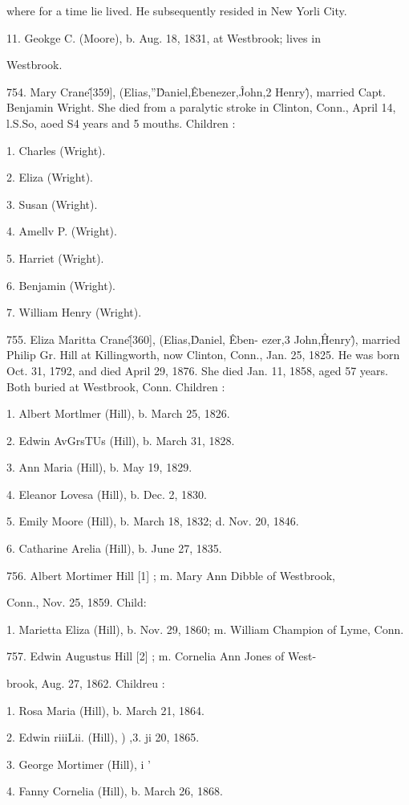 where for a time lie lived. He subsequently resided in New 
Yorli City. 

11. Geokge C. (Moore), b. Aug. 18, 1831, at Westbrook; lives in 

Westbrook. 

754. Mary Crane\^ [359], (Elias,''\^ Daniel,\^ Ebenezer,\^ John,2 
Henry\^), married Capt. Benjamin Wright. She died from a 
paralytic stroke in Clinton, Conn., April 14, l.S.So, aoed S4 years 
and 5 mouths. Children : 

1. Charles (Wright). 

2. Eliza (Wright). 

3. Susan (Wright). 

4. Amellv P. (Wright). 

5. Harriet (Wright). 

6. Benjamin (Wright). 

7. William Henry (Wright). 

755. Eliza Maritta Crane\^ [360], (Elias,\^ Daniel, \^ Eben- 
ezer,3 John,\^ Henry\^), married Philip Gr. Hill at Killingworth, 
now Clinton, Conn., Jan. 25, 1825. He was born Oct. 31, 1792, 
and died April 29, 1876. She died Jan. 11, 1858, aged 57 years. 
Both buried at Westbrook, Conn. Children : 

1. Albert Mortlmer (Hill), b. March 25, 1826. 

2. Edwin AvGrsTUs (Hill), b. March 31, 1828. 

3. Ann Maria (Hill), b. May 19, 1829. 

4. Eleanor Lovesa (Hill), b. Dec. 2, 1830. 

5. Emily Moore (Hill), b. March 18, 1832; d. Nov. 20, 1846. 

6. Catharine Arelia (Hill), b. June 27, 1835. 

756. Albert Mortimer Hill [1] ; m. Mary Ann Dibble of Westbrook, 

Conn., Nov. 25, 1859. Child: 

1. Marietta Eliza (Hill), b. Nov. 29, 1860; m. William 
Champion of Lyme, Conn. 

757. Edwin Augustus Hill [2] ; m. Cornelia Ann Jones of West- 

brook, Aug. 27, 1862. Childreu : 

1. Rosa Maria (Hill), b. March 21, 1864. 

2. Edwin riiiLii. (Hill), ) ,3. ji 20, 1865. 

3. George Mortimer (Hill), i ' 

4. Fanny Cornelia (Hill), b. March 26, 1868. 


